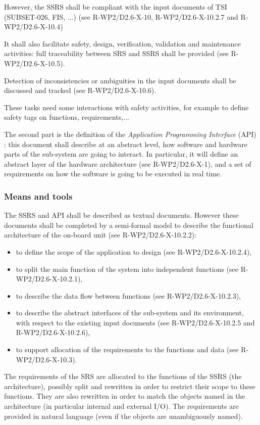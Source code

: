 However, the SSRS shall be compliant with the input documents of TSI (SUBSET-026, FIS, ...) (see R-WP2/D2.6-X-10, R-WP2/D2.6-X-10.2.7 and R-WP2/D2.6-X-10.4)

It shall also facilitate safety, design, verification, validation and maintenance activities: full traceability between SRS and SSRS shall be provided (see R-WP2/D2.6-X-10.5).

Detection of inconsistencies or ambiguities in the input documents shall be discussed and tracked (see R-WP2/D2.6-X-10.6).

These tasks need some interactions with safety activities, for example to define safety tags on functions, requirements,...

The second part is the definition of the \textit{Application Programming Interface} (API) : this document shall describe at an abstract level, how software and hardware parts of the sub-system are going to interact.
In particular, it will define an abstract layer of the hardware architecture (see R-WP2/D2.6-X-1), and a set of requirements on how the software is going to be executed in real time.

\subsubsection{Means and tools}

The SSRS and API shall be described as textual documents.
However these documents shall be completed by a semi-formal model to describe the functional architecture of the on-board unit (see R-WP2/D2.6-X-10.2.2):

\begin{itemize}
\item to  define the scope of the application to design (see R-WP2/D2.6-X-10.2.4),
\item to split the main function of the system into independent functions (see R-WP2/D2.6-X-10.2.1),
\item to describe the data flow between functions (see R-WP2/D2.6-X-10.2.3),
\item to describe the abstract interfaces of the sub-system and its environment, with respect to the existing input documents (see R-WP2/D2.6-X-10.2.5 and R-WP2/D2.6-X-10.2.6),
\item to  support allocation of the requirements to  the functions and data (see R-WP2/D2.6-X-10.3).
\end{itemize}

The requirements of the SRS are allocated to the
functions of the SSRS (the architecture), possibly split and rewritten in order to restrict their scope to these
functions. They are also rewritten in order to match the objects named in
the architecture (in particular internal and external I/O). The requirements are provided in natural language
(even if the objects are unambiguously named).

